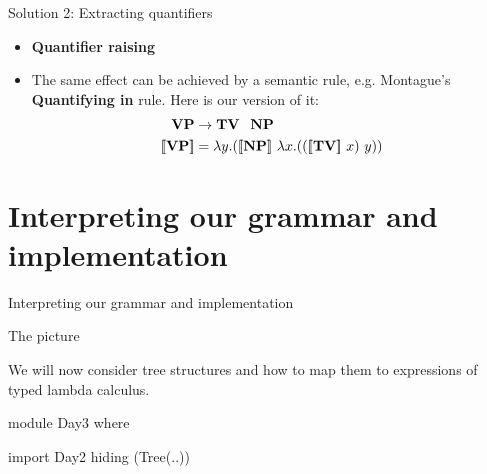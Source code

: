 \documentclass[xcolor=dvipsnames]{beamer}
\newcommand{\sem}[1]{\ensuremath{[\hspace{-1.8pt}[ #1 ]\hspace{-1.8pt}]}}
\begin{document}
\begin{frame}{Solution 2: Extracting quantifiers}

\begin{itemize}
\item {\bf Quantifier raising}
\item The same effect can be achieved by a semantic rule, e.g. 
{Montague's {\bf Quantifying in} rule}.
Here is our version of it:
\begin{align*}
\textbf{VP} &\to \textbf{TV\ \ NP}\\
\sem{\textbf{VP}} &= \lambda y.(\sem{\textbf{NP}}\ \lambda x.((\sem{\textbf{TV}}\ x)\ y))
\end{align*}
\end{itemize}
\end{frame}


\section{Interpreting our grammar and implementation}

\begin{frame}{}

\begin{center}
{\Large Interpreting our grammar and implementation}
\end{center}
\end{frame}

\begin{frame}[fragile]{The picture}

\begin{center}
%
\end{center}\pause

We will now consider tree structures and how to map them to expressions of typed lambda calculus.

\vspace{.4cm}

\begin{code}
module Day3 where

import Day2 hiding (Tree(..))
\end{code}
\end{frame}
\end{document}
